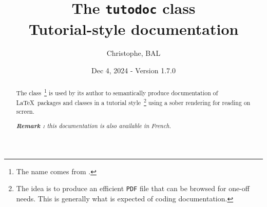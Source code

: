 \newcommand{\FTroot}{}
\def\FTroot{tmp.west}

\newcommand\contribtranslatedirtree{
  \begin{tikzpicture}%
    \draw[color=black, thick]
      \FTdirO(\FTroot,root,translate){
        \FTdirC(root,changes,changes){
        }
        \FTdirO(root,en,en) {
          \FTdirC(en,api,api) {
          }
          \FTdirC(en,doc,doc) {
          }
        }
        \FTdirC(root,fr,fr){
        }
        \FTdirC(root,status,status){
          \FTdirO(status,en,en) {
            \FTfile(en,api.yaml)
            \FTfile(en,manual.yaml)
          }
          \FTdirC(status,fr,fr){
          }
        }
        \FTfile(root,README.md)
        \FTfile(root,LICENSE.txt)
      };
  \end{tikzpicture}
}





\title{The \texttt{tutodoc} class \\ Tutorial-style documentation}
\author{Christophe, BAL}
\date{Dec 4, 2024 - Version 1.7.0}

\maketitle

\begin{abstract}
    The \thisproj{} class\,%
    \footnote{
        The name comes from .
    }
    is used by its author to semantically produce documentation of \LaTeX\ packages and classes in a tutorial style\,%
    \footnote{
        The idea is to produce an efficient \texttt{PDF} file that can be browsed for one-off needs. This is generally what is expected of coding documentation.
    }
    using a sober rendering for reading on screen.

    \smallskip

    \noindent
    \emph{\textbf{Remark :} this documentation is also available in French.}
\end{abstract}

\tdocsep

